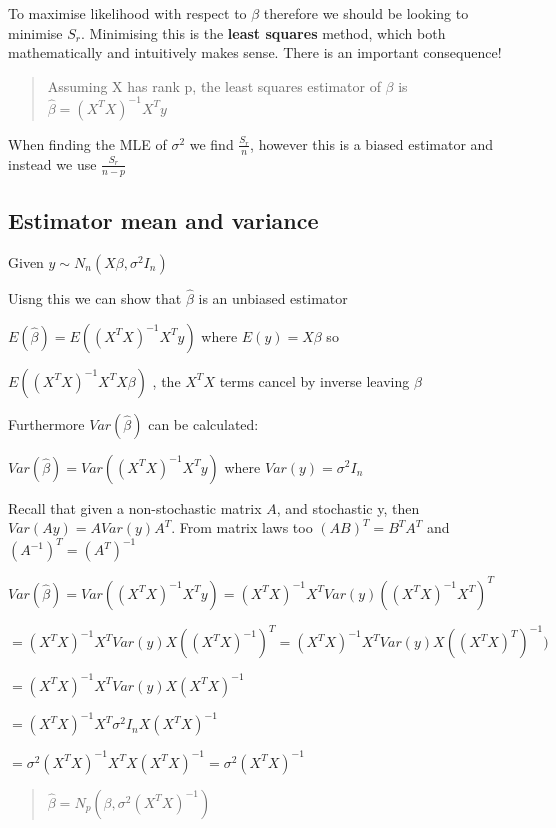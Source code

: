 \documentclass[
  letterpaper,
  DIV=11,
  numbers=noendperiod]{scrreprt}
\begin{document}
To maximise likelihood with respect to \(\beta\) therefore we should be
looking to minimise \(S_r\). Minimising this is the \textbf{least
squares} method, which both mathematically and intuitively makes sense.
There is an important consequence!

\begin{quote}
Assuming X has rank p, the least squares estimator of \(\beta\) is
\(\hat{\beta} = (X^TX)^{-1}X^Ty\)
\end{quote}

When finding the MLE of \(\sigma^2\) we find \(\frac{S_r}{n}\), however
this is a biased estimator and instead we use \(\frac{S_r}{n-p}\)

\hypertarget{estimator-mean-and-variance}{%
\subsection{Estimator mean and
variance}\label{estimator-mean-and-variance}}

Given \(y \sim N_n(X\beta, \sigma^2I_n)\)

Uisng this we can show that \(\hat{\beta}\) is an unbiased estimator

\(E(\hat{\beta}) = E((X^TX)^{-1}X^Ty)\) where \(E(y) = X\beta\) so

\(E((X^TX)^{-1}X^TX\beta)\) , the \(X^TX\) terms cancel by inverse
leaving \(\beta\)

Furthermore \(Var(\hat{\beta})\) can be calculated:

\(Var(\hat{\beta}) = Var((X^TX)^{-1}X^Ty)\) where
\(Var(y) = \sigma^2I_n\)

Recall that given a non-stochastic matrix \(A\), and stochastic y, then
\(Var(Ay) = A Var(y) A^T\). From matrix laws too \((AB)^T = B^TA^T\) and
\((A^{-1})^T = (A^T)^{-1}\)

\(Var(\hat{\beta}) = Var((X^TX)^{-1}X^Ty) = (X^TX)^{-1}X^T Var(y)((X^TX)^{-1}X^T)^T\)

\(= (X^TX)^{-1}X^T Var(y) X((X^TX)^{-1})^T = (X^TX)^{-1}X^T Var(y) X((X^TX)^T)^{-1})\)

\(= (X^TX)^{-1}X^T Var(y) X(X^TX)^{-1}\)

\(= (X^TX)^{-1}X^T \sigma^2 I_n X(X^TX)^{-1}\)

\(= \sigma^2 (X^TX)^{-1}X^TX(X^TX)^{-1} = \sigma^2 (X^TX)^{-1}\)

\begin{quote}
\(\hat{\beta} = N_p(\beta, \sigma^2 (X^TX)^{-1})\)
\end{quote}
\end{document}
